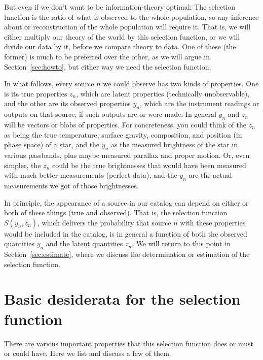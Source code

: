 \documentclass[modern]{aastex62}
\newcommand{\sectionname}{Section}
\begin{document}
But even if we don't want to be information-theory optimal: The
selection function is the ratio of what is observed to the whole
population, so any inference about or reconstruction of the whole
population will require it.
That is, we will either multiply our theory of the world by this
selection function, or we will divide our data by it, before we
compare theory to data.
One of these (the former) is much to be preferred over the other, as
we will argue in \sectionname~\ref{sec:howto}, but either way we
need the selection function.

In what follows, every source $n$ we could observe has two kinds of
properties.
One is its true properties $z_n$, which are latent
properties (technically unobservable), and the other are its observed
properties $y_n$, which are the instrument readings or outputs on that
source, if such outputs are or were made.
In general $y_n$ and $z_n$ will be vectors or blobs of properties.
For concreteness, you could think of the $z_n$ as being the true
temperature, surface gravity, composition, and position (in phase
space) of a star, and the $y_n$ as the measured brightness of the star
in various passbands, plus maybe measured parallax and proper motion.
Or, even simpler, the $z_n$ could be the true brightnesses that would
have been measured with much better measurements (perfect data), and
the $y_n$ are the actual measurements we got of those brightnesses.

In principle, the appearance of a source in our catalog can depend
on either or both of these things (true and observed).
That is, the selection function $S(y_n, z_n)$, which delivers the
probability that source $n$ with these properties would be included in
the catalog, is in general a function of both the observed quantities
$y_n$ and the latent quantities $z_n$.
We will return to this point in \sectionname~\ref{sec:estimate},
where we discuss the determination or estimation of the selection
function.

\section{Basic desiderata for the selection function}\label{sec:desiderata}

There are various important properties that this selection function
does or must or could have.
Here we list and discuss a few of them.
\end{document}
